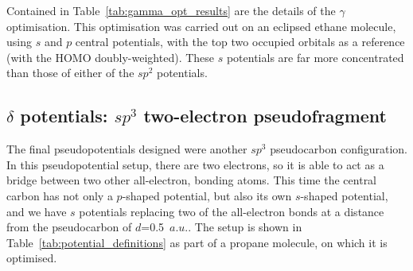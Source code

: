 \documentclass[aip,reprint,nofootinbib]{revtex4-1}
\begin{document}
Contained in Table~\ref{tab:gamma_opt_results} are the details of the $\gamma$ optimisation. This optimisation was carried out on an eclipsed ethane molecule, using $s$ and $p$ central potentials, with the top two occupied orbitals as a reference (with the HOMO doubly-weighted). These $s$ potentials are far more concentrated than those of either of the $sp^2$ potentials. 

\subsection{$\delta$ potentials: $sp^{3}$ two-electron pseudofragment}

The final pseudopotentials designed were another $sp^3$ pseudocarbon configuration. In this pseudopotential setup, there are two electrons, so it is able to act as a bridge between two other all-electron, bonding atoms. This time the central carbon has not only a $p$-shaped potential, but also its own $s$-shaped potential, and we have $s$ potentials replacing two of the all-electron bonds at a distance from the pseudocarbon of $d$=0.5~$a.u.$. The setup is shown in Table~\ref{tab:potential_definitions} as part of a propane molecule, on which it is optimised.
\end{document}
